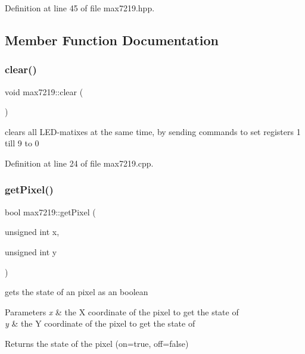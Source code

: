Definition at line 45 of file max7219.\+hpp.



\subsection{Member Function Documentation}
\mbox{\label{classmax7219_a285fdbbb7c29dcaa10634ac6756d7b49}} 
\subsubsection{\texorpdfstring{clear()}{clear()}}
{\footnotesize\ttfamily void max7219\+::clear (\begin{DoxyParamCaption}{ }\end{DoxyParamCaption})}



clears all L\+E\+D-\/matixes at the same time, by sending commands to set registers 1 till 9 to 0 



Definition at line 24 of file max7219.\+cpp.

\mbox{\label{classmax7219_a50efeaec89dc19034359967de0c5fe97}} 
\subsubsection{\texorpdfstring{get\+Pixel()}{getPixel()}}
{\footnotesize\ttfamily bool max7219\+::get\+Pixel (\begin{DoxyParamCaption}\item[{unsigned int}]{x,  }\item[{unsigned int}]{y }\end{DoxyParamCaption})}



gets the state of an pixel as an boolean 


\begin{DoxyParams}{Parameters}
{\em x} & the X coordinate of the pixel to get the state of \\
\hline
{\em y} & the Y coordinate of the pixel to get the state of \\
\hline
\end{DoxyParams}
\begin{DoxyReturn}{Returns}
the state of the pixel (on=true, off=false) 
\end{DoxyReturn}


